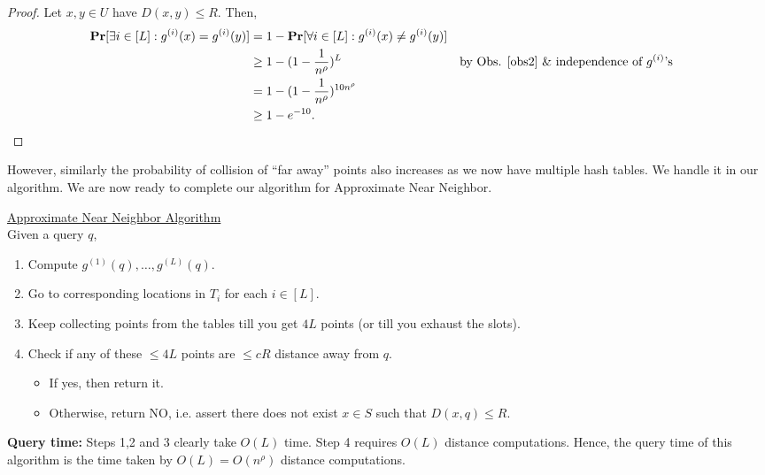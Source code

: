\documentclass[11pt]{article}
\begin{document}
\begin{proof}
Let $x,y\in U$ have $D(x,y)\leq R$. Then, 
\begin{align*}
    \Pr[\exists i\in [L]: g^{(i)}(x) = g^{(i)}(y)] &= 1 - \Pr[\forall i \in [L]: g^{(i)}(x) \ne g^{(i)}(y)]\\
    &\geq 1 - (1-\frac{1}{n^{\rho}})^L &&\text{by Obs. \ref{obs2} \& independence of $g^{(i)}$'s}\\
    &= 1 - (1-\frac{1}{n^{\rho}})^{10n^\rho}\\
    &\geq 1 - e^{-10}.
\end{align*}
\end{proof}
However, similarly the probability of collision of ``far away'' points also increases as we now have multiple hash tables. We handle it in our algorithm. We are now ready to complete our algorithm for {\sc Approximate Near Neighbor}.
\begin{mdframed}[backgroundcolor=blue!05,topline=false,bottomline=false,leftline=false,rightline=false] \underline{\sc Approximate Near Neighbor Algorithm}\\ Given a query $q$,
\begin{enumerate}
    \item Compute $g^{(1)}(q),\ldots,g^{(L)}(q)$.
    \item Go to corresponding locations in $T_i$ for each $i\in [L]$.
    \item Keep collecting points from the tables till you get $4L$ points (or till you exhaust the slots).
        \item Check if any of these $\leq 4L$ points are $\leq cR$ distance away from $q$.
        \begin{itemize}
    \item If yes, then return it.
    \item Otherwise, return NO, i.e. assert there does not exist $x\in S$ such that $D(x,q)\leq R$.
    \end{itemize}
\end{enumerate}
\end{mdframed}
\textbf{Query time:} Steps 1,2 and 3 clearly take $O(L)$ time. Step 4 requires $O(L)$ distance computations. Hence, the query time of this algorithm is the time taken by $O(L)=O(n^\rho)$ distance computations. 
\end{document}
